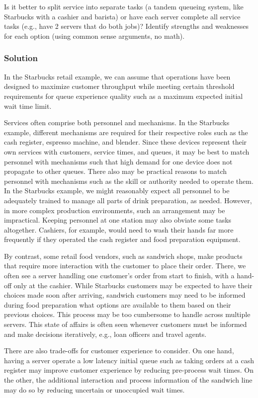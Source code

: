 \documentclass[letterpaper]{amsart}
\begin{document}
\section{} %
Is it better to split service into separate tasks (a tandem queueing system, like Starbucks
with a cashier and barista) or have each server complete all service tasks (e.g., have 2
servers that do both jobs)? Identify strengths and weaknesses for each option (using
common sense arguments, no math).
\subsubsection*{Solution}
In the Starbucks retail example, we can assume that operations have been
designed to maximize customer throughput while meeting certain threshold
requirements for queue experience quality such as a maximum expected initial wait time limit.

Services often comprise both personnel and mechanisms. In the Starbucks example,
different mechanisms are required for their respective roles such as the cash
register, espresso machine, and blender. Since these devices represent their own
services with customers, service times, and queues, it may be best to match
personnel with mechanisms such that high demand for one device does not
propagate to other queues. There also may be practical reasons to match
personnel with mechanisms such as the skill or authority needed to operate them.
In the Starbucks example, we might reasonably expect all personnel to be
adequately trained to manage all parts of drink preparation, as needed. However,
in more complex production environments, such an arrangement may be impractical.
Keeping personnel at one station may also obviate some tasks altogether.
Cashiers, for example, would need to wash their hands far more frequently if
they operated the cash register and food preparation equipment.

By contrast, some retail food vendors, such as sandwich shops, make products
that require more interaction with the customer to place their order. There, we
often see a server handling one customer's order from start to finish, with a
hand-off only at the cashier. While Starbucks customers may be expected to have
their choices made soon after arriving, sandwich customers may need to be
informed during food preparation what options are available to them based on
their previous choices. This process may be too cumbersome to handle across
multiple servers. This state of affairs is often seen whenever customers must be
informed and make decisions iteratively, e.g., loan officers and travel agents.

There are also trade-offs for customer experience to consider. On one hand, having a
server operate a low latency initial queue such as taking orders at a cash
register may improve customer experience by reducing pre-process wait times.
On the other, the additional interaction and process information of the
sandwich line may do so by reducing uncertain or unoccupied wait times.
\end{document}

